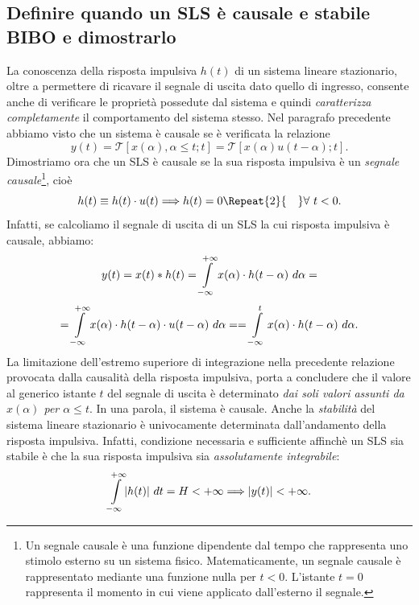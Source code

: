 \documentclass[12pt,oneside,openany]{memoir}
\numberwithin{equation}{subsection}
\DeclarePairedDelimiter{\abs}{\lvert}{\rvert}
\newcommand{\quads}[1]{\Repeat{#1}{\quad}}
\newcommand{\dt}{\ dt}
\begin{document}

\newpage
\subsection{Definire quando un SLS \`e causale e stabile BIBO e dimostrarlo}
La conoscenza della risposta impulsiva $h(t)$ di un sistema lineare stazionario,
oltre a permettere di ricavare il segnale di uscita dato quello di ingresso,
consente anche di verificare le propriet\`a possedute dal sistema e quindi
\textit{caratterizza completamente} il comportamento del sistema stesso. Nel
paragrafo precedente abbiamo visto che un sistema \`e causale se \`e verificata
la relazione
\[
    y(t) = \mathcal{T}[x(\alpha), \alpha \leq t; t] = \mathcal{T}[x(\alpha)
    u(t - \alpha); t].
\]
Dimostriamo ora che un SLS \`e causale se la sua risposta impulsiva \`e un
\textit{segnale causale}\footnote{Un segnale causale \`e una
funzione dipendente dal tempo che rappresenta uno stimolo esterno su un sistema
fisico. Matematicamente, un segnale causale \`e rappresentato mediante una
funzione nulla per $t < 0$. L'istante $t = 0$ rappresenta il momento in cui
viene applicato dall'esterno il segnale.}, cio\`e
\[
    h(t) \equiv h(t) \cdot u(t) \Longrightarrow h(t) = 0 \quads{2} \forall
    \ t < 0.
\]
Infatti, se calcoliamo il segnale di uscita di un SLS la cui risposta impulsiva
\`e causale, abbiamo:
\[
    y(t) = x(t) * h(t) = \int\displaylimits_{-\infty}^{+\infty} x(\alpha)
    \cdot h(t - \alpha) \ d\alpha = 
\]
\[
    = \int\displaylimits_{-\infty}^{+\infty}
    x(\alpha) \cdot h(t - \alpha) \cdot u(t - \alpha) \ d\alpha =
    = \int\displaylimits_{-\infty}^{t} x(\alpha) \cdot h(t - \alpha) \ d\alpha.
\]
La limitazione dell'estremo superiore di integrazione nella precedente relazione
provocata dalla causalit\`a della risposta impulsiva, porta a concludere che il
valore al generico istante $t$ del segnale di uscita \`e determinato \textit{dai
soli valori assunti da $x(\alpha)$ per $\alpha \leq t$}. In una parola, il
sistema \`e causale.
\bigbreak
Anche la \textit{stabilit\`a} del sistema lineare stazionario \`e univocamente
determinata dall'andamento della risposta impulsiva. Infatti, condizione
necessaria e sufficiente affinch\`e un SLS sia stabile \`e che la sua risposta
impulsiva sia \textit{assolutamente integrabile}:
\[
    \int\displaylimits_{-\infty}^{+\infty} \abs{h(t)} \dt = H < +\infty
    \Longrightarrow \abs{y(t)} < +\infty.
\]
\end{document}

